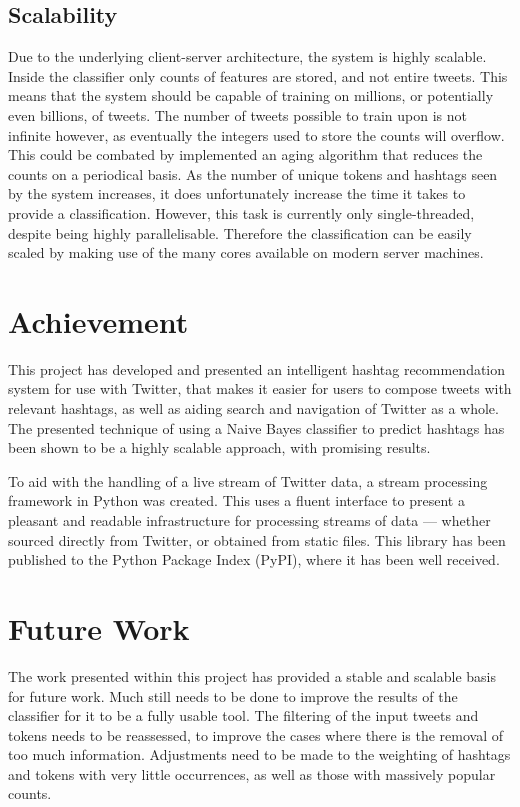 \documentclass[11pt,a4paper]{report}
\begin{document}
\subsection{Scalability}
Due to the underlying client-server architecture, the system is highly scalable. Inside the classifier only counts of features are stored, and not entire tweets. This means that the system should be capable of training on millions, or potentially even billions, of tweets. The number of tweets possible to train upon is not infinite however, as eventually the integers used to store the counts will overflow. This could be combated by implemented an aging algorithm that reduces the counts on a periodical basis. As the number of unique tokens and hashtags seen by the system increases, it does unfortunately increase the time it takes to provide a classification. However, this task is currently only single-threaded, despite being highly parallelisable. Therefore the classification can be easily scaled by making use of the many cores available on modern server machines.

\section{Achievement}
This project has developed and presented an intelligent hashtag recommendation system for use with Twitter, that makes it easier for users to compose tweets with relevant hashtags, as well as aiding search and navigation of Twitter as a whole. The presented technique of using a Naive Bayes classifier to predict hashtags has been shown to be a highly scalable approach, with promising results.

To aid with the handling of a live stream of Twitter data, a stream processing framework in Python was created. This uses a fluent interface to present a pleasant and readable infrastructure for processing streams of data --- whether sourced directly from Twitter, or obtained from static files. This library has been published to the Python Package Index (PyPI), where it has been well received.

\section{Future Work}
The work presented within this project has provided a stable and scalable basis for future work. Much still needs to be done to improve the results of the classifier for it to be a fully usable tool. The filtering of the input tweets and tokens needs to be reassessed, to improve the cases where there is the removal of too much information. Adjustments need to be made to the weighting of hashtags and tokens with very little occurrences, as well as those with massively popular counts.
\end{document}
